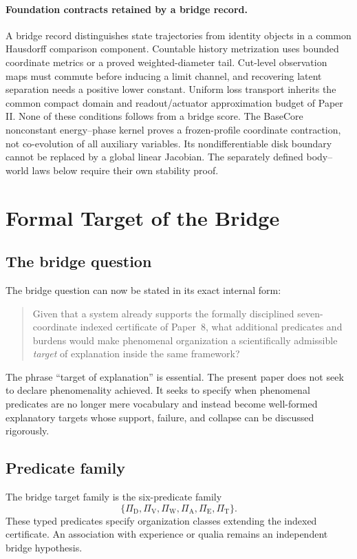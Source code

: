 \documentclass[11pt,a4paper]{article}
\theoremstyle{definition}
\newcommand{\PiD}{\Pi_{\mathrm{D}}}
\newcommand{\PiV}{\Pi_{\mathrm{V}}}
\newcommand{\PiW}{\Pi_{\mathrm{W}}}
\newcommand{\PiA}{\Pi_{\mathrm{A}}}
\newcommand{\PiE}{\Pi_{\mathrm{E}}}
\newcommand{\PiT}{\Pi_{\mathrm{T}}}
\begin{document}
\paragraph{Foundation contracts retained by a bridge record.}
A bridge record distinguishes state trajectories from identity objects in a
common Hausdorff comparison component. Countable history metrization uses
bounded coordinate metrics or a proved weighted-diameter tail. Cut-level
observation maps must commute before inducing a limit channel, and recovering
latent separation needs a positive lower constant. Uniform loss transport
inherits the common compact domain and readout/actuator approximation budget
of Paper II. None of these conditions follows from a bridge score. The
BaseCore nonconstant energy--phase kernel proves a frozen-profile coordinate
contraction, not co-evolution of all auxiliary variables. Its nondifferentiable
disk boundary cannot be replaced by a global linear Jacobian. The separately
defined body--world laws below require their own stability proof.

\section{Formal Target of the Bridge}
\subsection{The bridge question}
The bridge question can now be stated in its exact internal form:
\begin{quote}
Given that a system already supports the formally disciplined seven-coordinate indexed certificate of Paper~8, what additional predicates and burdens would make phenomenal organization a scientifically admissible \emph{target} of explanation inside the same framework?
\end{quote}
The phrase ``target of explanation'' is essential. The present paper does not seek to declare phenomenality achieved. It seeks to specify when phenomenal predicates are no longer mere vocabulary and instead become well-formed explanatory targets whose support, failure, and collapse can be discussed rigorously.

\subsection{Predicate family}
The bridge target family is the six-predicate family
\[
\{\PiD,\allowbreak \PiV,\allowbreak \PiW,\allowbreak \PiA,\allowbreak \PiE,\allowbreak \PiT\}.
\]
These typed predicates specify organization classes extending the indexed certificate. An association with experience or qualia remains an independent bridge hypothesis.
\end{document}
